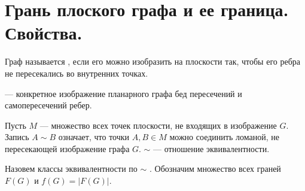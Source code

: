 \section{Грань плоского графа и ее граница. Свойства.}
\begin{definition}
    Граф называется , если его можно изобразить на плоскости так, чтобы его ребра не пересекались во внутренних точках. 
\end{definition}
\begin{definition}
     --- конкретное изображение планарного графа бед пересечений и самопересечений ребер.
\end{definition}
\begin{definition}[Грань]
	Пусть $M$ --- множество всех точек плоскости, не входящих в изображение $G$. Запись $A \sim B $ означает, что точки $A, B \in M$  можно соединить ломаной, не пересекающей изображение графа $G$. $\sim$ --- отношение эквивалентности.

	Назовем классы эквивалентности по $\sim$ . Обозначим множество всех граней $F(G)$ и  $f(G) = \lvert F(G) \rvert$.
\end{definition}

